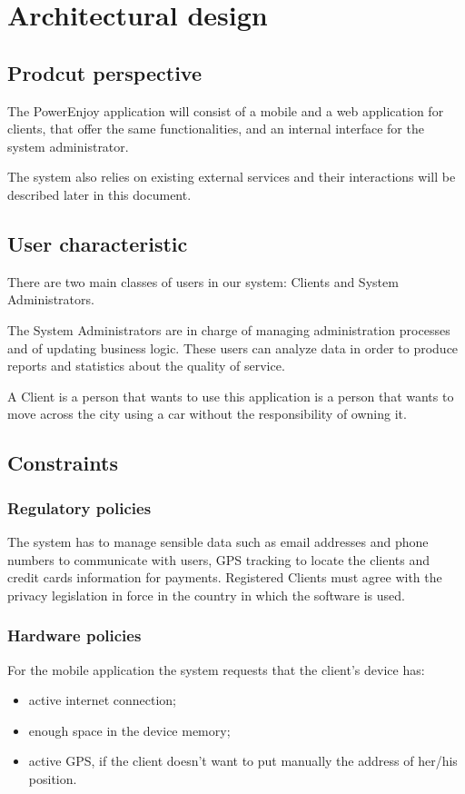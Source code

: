 \chapter{Architectural design}

\section{Prodcut perspective}
The PowerEnjoy application will consist of a mobile and a web application for clients, that offer the same functionalities, and an internal interface for the system administrator.

The system also relies on existing external services and their interactions will be described later in this document.

\section{User characteristic}
There are two main classes of users in our system: Clients and System Administrators.

The System Administrators are in charge of managing administration processes and of updating business logic. These users can analyze data in order to produce reports and statistics about the quality of service.

A Client is a person that wants to use this application is a person that wants to move across the city using a car without the responsibility of owning it.

\section{Constraints}

\subsection{Regulatory policies}

The system has to manage sensible data such as email addresses and phone numbers to communicate with users, GPS tracking to locate the clients and credit cards information for payments.
Registered Clients must agree with the privacy legislation in force in the country in which the software is used.

\subsection{Hardware policies}
For the mobile application the system requests that the client’s device has:
\begin{itemize}
\item active internet connection;
\item enough space in the device memory;
\item active GPS, if the client doesn’t want to put manually the address of her/his position.
\end{itemize}

